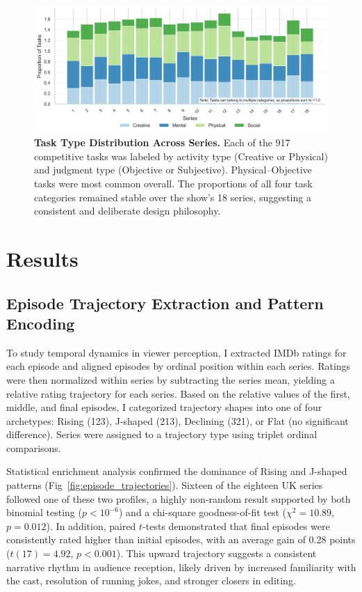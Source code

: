 \documentclass[10pt,letterpaper]{article}
\begin{document}
\begin{figure}[!h]
\centering
\includegraphics[width=\linewidth]{FiguresPNG/Fig5.png}
\caption{{\bf Task Type Distribution Across Series.}
Each of the 917 competitive tasks was labeled by activity type (Creative or Physical) and judgment type (Objective or Subjective). Physical–Objective tasks were most common overall. The proportions of all four task categories remained stable over the show’s 18 series, suggesting a consistent and deliberate design philosophy.}
\label{fig:task_format}
\end{figure}
\FloatBarrier





\section*{Results}


\subsection*{Episode Trajectory Extraction and Pattern Encoding}

To study temporal dynamics in viewer perception, I extracted IMDb ratings for each episode and aligned episodes by ordinal position within each series. Ratings were then normalized within series by subtracting the series mean, yielding a relative rating trajectory for each series. Based on the relative values of the first, middle, and final episodes, I categorized trajectory shapes into one of four archetypes: Rising (123), J-shaped (213), Declining (321), or Flat (no significant difference). Series were assigned to a trajectory type using triplet ordinal comparisons.

Statistical enrichment analysis confirmed the dominance of Rising and J-shaped patterns (Fig~\ref{fig:episode_trajectories}). Sixteen of the eighteen UK series followed one of these two profiles, a highly non-random result supported by both binomial testing ($p < 10^{-6}$) and a chi-square goodness-of-fit test ($\chi^2 = 10.89$, $p = 0.012$). In addition, paired $t$-tests demonstrated that final episodes were consistently rated higher than initial episodes, with an average gain of 0.28 points ($t(17) = 4.92$, $p < 0.001$). This upward trajectory suggests a consistent narrative rhythm in audience reception, likely driven by increased familiarity with the cast, resolution of running jokes, and stronger closers in editing.
\end{document}
